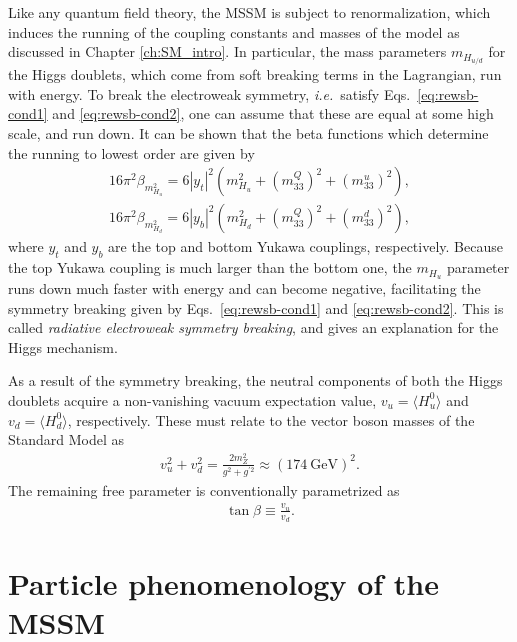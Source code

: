\documentclass[twoside,english]{uiofysmaster}
\begin{document}
Like any quantum field theory, the MSSM is subject to renormalization, which induces the running of the coupling constants and masses of the model as discussed in Chapter \ref{ch:SM_intro}. In particular, the mass parameters $m_{H_{u/d}}$ for the Higgs doublets, which come from soft breaking terms in the Lagrangian, run with energy. To break the electroweak symmetry, {\it i.e.}\ satisfy Eqs.\ \eqref{eq:rewsb-cond1} and \eqref{eq:rewsb-cond2}, one can assume that these are equal at some high scale, and run down. It can be shown that the beta functions which determine the running to lowest order are given by
\begin{align}
	16\pi^2 \beta_{m_{H_u}^2} = 6|y_t|^2\left( m_{H_u}^2 + ( m_{33}^Q)^2 + (m_{33}^u)^2 \right),\\
	16\pi^2 \beta_{m_{H_d}^2} = 6|y_b|^2\left( m_{H_d}^2 + ( m_{33}^Q)^2 + (m_{33}^d)^2 \right),
\end{align}
where $y_t$ and $y_b$ are the top and bottom Yukawa couplings, respectively. Because the top Yukawa coupling is much larger than the bottom one, the $m_{H_u}$ parameter runs down much faster with energy and can become negative, facilitating the symmetry breaking given by Eqs.\ \eqref{eq:rewsb-cond1} and \eqref{eq:rewsb-cond2}. This is called {\it radiative electroweak symmetry breaking}, and gives an explanation for the Higgs mechanism.

As a result of the symmetry breaking, the neutral components of both the Higgs doublets acquire a non-vanishing vacuum expectation value, $v_u = \langle H_u^0 \rangle$ and $v_d = \langle H_d^0 \rangle$, respectively. These must relate to the vector boson masses of the Standard Model as
\begin{align}
	v_u^2 + v_d^2 = \frac{2m_Z^2}{g^2 + g^{'2}} \approx (174 ~\mathrm{GeV})^2.
\end{align}
The remaining free parameter is conventionally parametrized as
\begin{align}
	\tan \beta \equiv \frac{v_u}{v_d}.
\end{align}

\section{Particle phenomenology of the MSSM}
\end{document}
